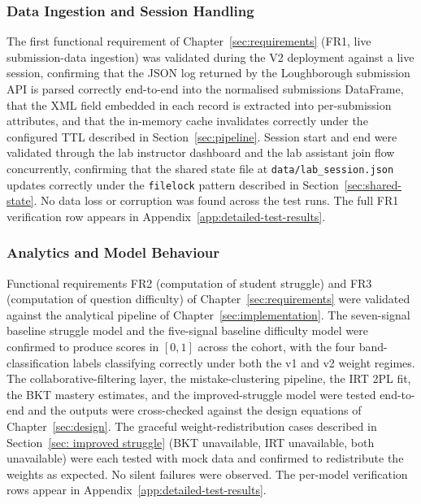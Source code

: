 \subsubsection{Data Ingestion and Session Handling} \label{sec:eval-data-ingestion}
The first functional requirement of Chapter~\ref{sec:requirements} (FR1, live submission-data ingestion) was validated during the V2 deployment against a live session, confirming that the JSON log returned by the Loughborough submission API is parsed correctly end-to-end into the normalised submissions DataFrame, that the XML field embedded in each record is extracted into per-submission attributes, and that the in-memory cache invalidates correctly under the configured TTL described in Section~\ref{sec:pipeline}.
Session start and end were validated through the lab instructor dashboard and the lab assistant join flow concurrently, confirming that the shared state file at \texttt{data/lab\_session.json} updates correctly under the \texttt{filelock} pattern described in Section~\ref{sec:shared-state}.
No data loss or corruption was found across the test runs. The full FR1 verification row appears in Appendix~\ref{app:detailed-test-results}.

\subsubsection{Analytics and Model Behaviour} \label{sec:eval-analytics-behaviour}
Functional requirements FR2 (computation of student struggle) and FR3 (computation of question difficulty) of Chapter~\ref{sec:requirements} were validated against the analytical pipeline of Chapter~\ref{sec:implementation}.
The seven-signal baseline struggle model and the five-signal baseline difficulty model were confirmed to produce scores in $[0, 1]$ across the cohort, with the four band-classification labels classifying correctly under both the v1 and v2 weight regimes.
The collaborative-filtering layer, the mistake-clustering pipeline, the IRT 2PL fit, the BKT mastery estimates, and the improved-struggle model were tested end-to-end and the outputs were cross-checked against the design equations of Chapter~\ref{sec:design}.
The graceful weight-redistribution cases described in Section~\ref{sec: improved struggle} (BKT unavailable, IRT unavailable, both unavailable) were each tested with mock data and confirmed to redistribute the weights as expected. No silent failures were observed. The per-model verification rows appear in Appendix~\ref{app:detailed-test-results}.

